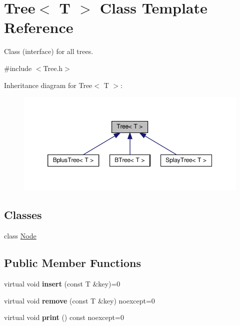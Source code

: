 \hypertarget{classTree}{}\section{Tree$<$ T $>$ Class Template Reference}
\label{classTree}


Class (interface) for all trees.  




{\ttfamily \#include $<$Tree.\+h$>$}



Inheritance diagram for Tree$<$ T $>$\+:
\nopagebreak
\begin{figure}[H]
\begin{center}
\leavevmode
\includegraphics[width=350pt]{classTree__inherit__graph}
\end{center}
\end{figure}
\subsection*{Classes}
\begin{DoxyCompactItemize}
\item 
class \hyperlink{classTree_1_1Node}{Node}
\end{DoxyCompactItemize}
\subsection*{Public Member Functions}
\begin{DoxyCompactItemize}
\item 
\mbox{\label{classTree_a33de7916dcffea3a4bebe97584f1c5c1}} 
virtual void {\bfseries insert} (const T \&key)=0
\item 
\mbox{\label{classTree_a24d087ff6f8a6f342717361825280fda}} 
virtual void {\bfseries remove} (const T \&key) noexcept=0
\item 
\mbox{\label{classTree_ae6779310befe6ae12ac32f93195bdfe3}} 
virtual void {\bfseries print} () const noexcept=0
\end{DoxyCompactItemize}
